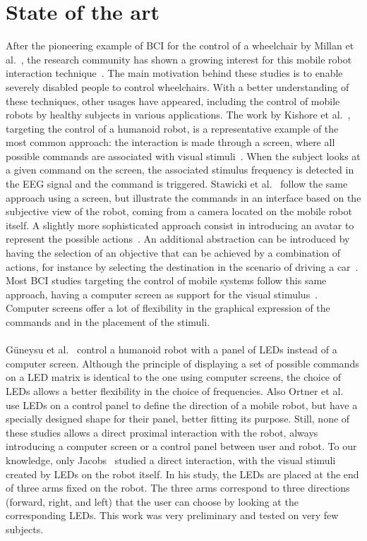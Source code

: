 \documentclass[smallextended]{svjour3}
\begin{document}
\section{State of the art}
\label{sec:soa}
After the pioneering example of BCI for the control of a wheelchair by Millan et al.~\cite{millan2004noninvasive}, the research community has shown a growing interest for this mobile robot interaction technique~\cite{Bi2013}. The main motivation behind these studies is to enable severely disabled people to control wheelchairs. With a better understanding of these techniques, other usages have appeared, including the control of mobile robots by healthy subjects in various applications. The work by Kishore et al.~\cite{kishore2014comparison}, targeting the control of a humanoid robot, is a representative example of the most common approach: the interaction is made through a screen, where all possible commands are associated with visual stimuli~\cite{Volosyak2009}. When the subject looks at a given command on the screen, the associated stimulus frequency is detected in the EEG signal and the command is triggered. Stawicki et al.~\cite{Stawicki2016} follow the same approach using a screen, but illustrate the commands in an interface based on the subjective view of the robot, coming from a camera located on the mobile robot itself. A slightly more sophisticated approach consist in introducing an avatar to represent the possible actions~\cite{Faller2010}. An additional abstraction can be introduced by having the selection of an objective that can be achieved by a combination of actions, for instance by selecting the destination in the scenario of driving a car~\cite{Fan2015}. Most BCI studies targeting the control of mobile systems follow this same approach, having a computer screen as support for the visual stimulus~\cite{Bi2013}. Computer screens offer a lot of flexibility in the graphical expression of the commands and in the placement of the stimuli. \\
\\
G{\"{u}}neysu et al.~\cite{Guneysu2013} control a humanoid robot with a panel of LEDs instead of a computer screen. Although the principle of displaying a set of possible commands on a LED matrix is identical to the one using computer screens, the choice of LEDs allows a better flexibility in the choice of frequencies. Also Ortner et al.~\cite{Ortner2010} use LEDs on a control panel to define the direction of a mobile robot, but have a specially designed shape for their panel, better fitting its purpose. Still, none of these studies allows a direct proximal interaction with the robot, always introducing a computer screen or a control panel between user and robot. To our knowledge, only Jacobs~\cite{Jacobs2013} studied a direct interaction, with the visual stimuli created by LEDs on the robot itself. In his study, the LEDs are placed at the end of three arms fixed on the robot. The three arms correspond to three directions (forward, right, and left) that the user can choose by looking at the corresponding LEDs. This work was very preliminary and tested on very few subjects.\\
\end{document}
